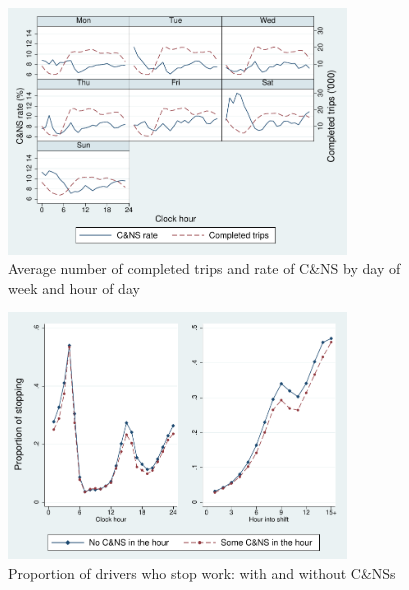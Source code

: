 \documentclass[reviewmode]{AEA}
\begin{document}
\FloatBarrier

\begin{figure}
	\centering
	\includegraphics[width=0.8\textwidth]{./fg/dowplot.pdf}
	\caption{Average number of completed trips and rate of C\&NS by day of week and hour of day}
	\label{fg:trips}
\end{figure}


\begin{figure}
		\includegraphics[width=0.8\textwidth]{./fg/modelfree_quit_vert.pdf}
		\caption{Proportion of drivers who stop work: with and without C\&NSs}
		\label{fg:quitbyhour}
\end{figure}
\end{document}
